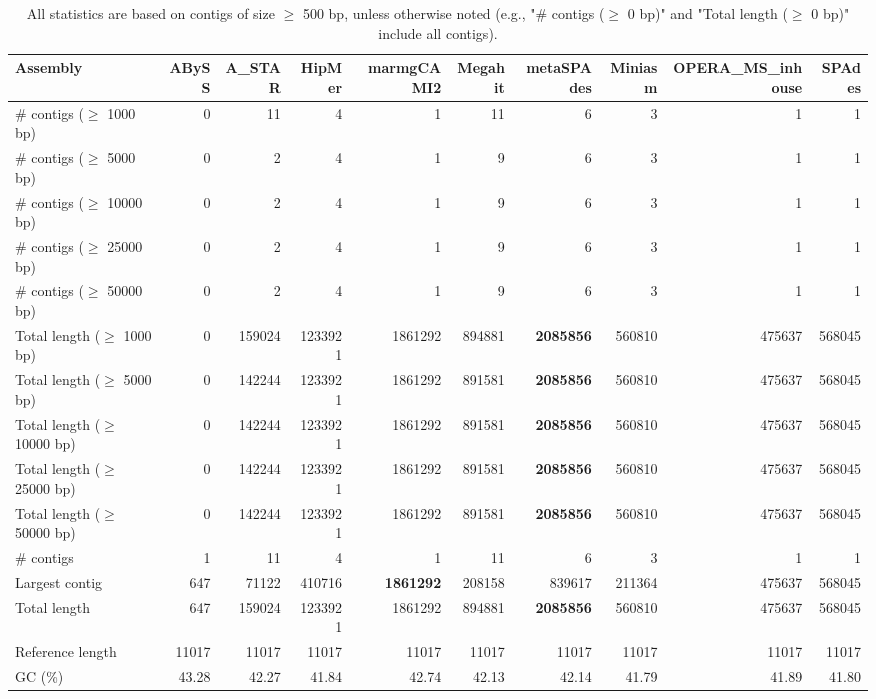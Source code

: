 \documentclass[12pt,a4paper]{article}
\begin{document}
\begin{table}[ht]
\begin{center}
\caption{All statistics are based on contigs of size $\geq$ 500 bp, unless otherwise noted (e.g., "\# contigs ($\geq$ 0 bp)" and "Total length ($\geq$ 0 bp)" include all contigs).}
\begin{tabular}{|l*{9}{|r}|}
\hline
Assembly & ABySS & A\_STAR & HipMer & marmgCAMI2 & Megahit & metaSPAdes & Miniasm & OPERA\_MS\_inhouse & SPAdes \\ \hline
\# contigs ($\geq$ 1000 bp) & 0 & 11 & 4 & 1 & 11 & 6 & 3 & 1 & 1 \\ \hline
\# contigs ($\geq$ 5000 bp) & 0 & 2 & 4 & 1 & 9 & 6 & 3 & 1 & 1 \\ \hline
\# contigs ($\geq$ 10000 bp) & 0 & 2 & 4 & 1 & 9 & 6 & 3 & 1 & 1 \\ \hline
\# contigs ($\geq$ 25000 bp) & 0 & 2 & 4 & 1 & 9 & 6 & 3 & 1 & 1 \\ \hline
\# contigs ($\geq$ 50000 bp) & 0 & 2 & 4 & 1 & 9 & 6 & 3 & 1 & 1 \\ \hline
Total length ($\geq$ 1000 bp) & 0 & 159024 & 1233921 & 1861292 & 894881 & {\bf 2085856} & 560810 & 475637 & 568045 \\ \hline
Total length ($\geq$ 5000 bp) & 0 & 142244 & 1233921 & 1861292 & 891581 & {\bf 2085856} & 560810 & 475637 & 568045 \\ \hline
Total length ($\geq$ 10000 bp) & 0 & 142244 & 1233921 & 1861292 & 891581 & {\bf 2085856} & 560810 & 475637 & 568045 \\ \hline
Total length ($\geq$ 25000 bp) & 0 & 142244 & 1233921 & 1861292 & 891581 & {\bf 2085856} & 560810 & 475637 & 568045 \\ \hline
Total length ($\geq$ 50000 bp) & 0 & 142244 & 1233921 & 1861292 & 891581 & {\bf 2085856} & 560810 & 475637 & 568045 \\ \hline
\# contigs & 1 & 11 & 4 & 1 & 11 & 6 & 3 & 1 & 1 \\ \hline
Largest contig & 647 & 71122 & 410716 & {\bf 1861292} & 208158 & 839617 & 211364 & 475637 & 568045 \\ \hline
Total length & 647 & 159024 & 1233921 & 1861292 & 894881 & {\bf 2085856} & 560810 & 475637 & 568045 \\ \hline
Reference length & 11017 & 11017 & 11017 & 11017 & 11017 & 11017 & 11017 & 11017 & 11017 \\ \hline
GC (\%) & 43.28 & 42.27 & 41.84 & 42.74 & 42.13 & 42.14 & 41.79 & 41.89 & 41.80 \\ \hline

\end{tabular}
\end{center}
\end{table}
\end{document}
